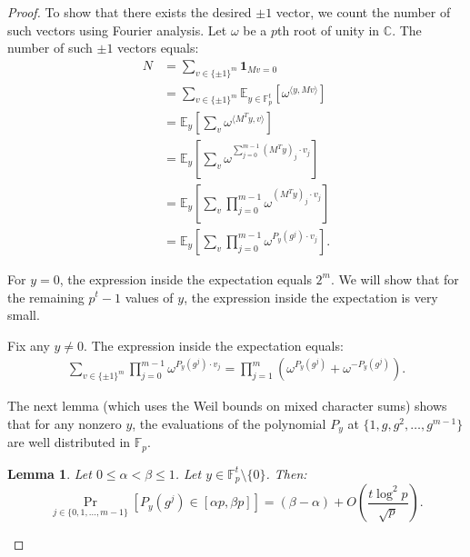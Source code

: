 \documentclass{article}
\newtheorem{lemma}[theorem]{Lemma}
\newcommand{\F}{\mathbb{F}}
\newcommand{\one}{{\mathbf{1}}}
\begin{document}
\begin{proof}
 To show that there exists the desired $\pm 1$ vector, we count the number of such vectors using Fourier analysis. Let $\omega$ be a $p$th root of unity in $\mathbb C$. The number of such $\pm 1$ vectors equals:
 \begin{align*}
 N &= \sum_{v \in \{\pm 1\}^m } \one_{M v = 0}\\
 &= \sum_{v \in \{\pm 1\}^m }  \mathbb E_{y \in \F_p^t}  \left[ \omega^{\langle y, Mv \rangle} \right]  \\
 &= \mathbb E_y \left[ \sum_v  \omega^{\langle M^T y, v \rangle}   \right]\\
 &= \mathbb E_y \left[ \sum_v  \omega^{\sum_{j=0}^{m-1} (M^T y)_j \cdot  v_j}   \right]\\
 &= \mathbb E_y \left[ \sum_v   \prod_{j=0}^{m-1} \omega^{(M^T y)_j \cdot  v_j}   \right]\\
 &= \mathbb E_y \left[ \sum_v \prod_{j=0}^{m-1} \omega^{P_y(g^{j}) \cdot  v_j} \right].
 \end{align*}
 

For $y = 0$, the expression inside the expectation equals $2^m$.
We will show that for the remaining $p^t -1$ values of $y$,
the expression inside the expectation is very small. 

Fix any $y \neq 0$. 
The expression inside the expectation equals:
\begin{align}
 \label{weilval}
\sum_{v \in \{\pm 1\}^m} \prod_{j=0}^{m-1} \omega^{P_y(g^{j}) \cdot  v_j} = \prod_{j=1}^m \left(\omega^{P_y(g^{j})} + \omega^{-P_y(g^{j})} \right).
\end{align}

The next lemma (which uses the Weil bounds on mixed character sums) shows that for any nonzero $y$, the evaluations of the polynomial $P_y$ at $\{1, g, g^2, \ldots, g^{m-1}\}$ are well distributed in $\F_p$.
\begin{lemma}
\label{lem:equidist}
Let $0 \leq \alpha <  \beta \leq 1$.
 Let $y \in \F_p^t \setminus \{0\}$. Then:
 $$ \Pr_{j \in \{0,1, \ldots, m-1\}}\left[ P_y(g^j) \in [\alpha p, \beta p] \right] = (\beta - \alpha )  + O\left(\frac{t\log^2 p}{\sqrt{p}} \right).$$
\end{lemma}


\end{proof}
\end{document}

